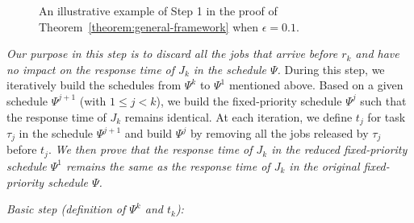   



\begin{figure*}[t]
  \centering
\caption{An illustrative example of Step 1 in the proof of Theorem~\ref{theorem:general-framework} when $\epsilon = 0.1$.}
\label{fig:example}  
\end{figure*}



\emph{Our purpose in this step is to discard all the jobs that arrive before $r_k$ and have no impact on the response time of $J_k$ in the schedule
  $\Psi$. } During this step, we iteratively build the schedules from $\Psi^k$ to $\Psi^1$ mentioned above. Based on a given schedule $\Psi^{j+1}$ (with $1 \leq j < k$), we build the fixed-priority schedule $\Psi^j$ such that the response time of $J_k$ remains identical. At each iteration, we define $t_j$ for task $\tau_j$ in the schedule $\Psi^{j+1}$ and build $\Psi^j$ by removing all the jobs released by $\tau_j$ before $t_j$. \emph{We then prove that the response time of $J_k$ in the reduced fixed-priority schedule $\Psi^1$ remains the same as the response time of $J_k$ in  the original fixed-priority schedule $\Psi$.}


\noindent\textit{Basic step (definition of $\Psi^k$ and $t_k$):} 

